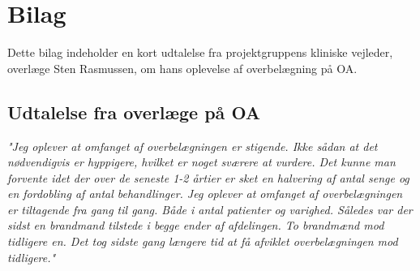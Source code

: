 \chapter{Bilag} \label{sten}
Dette bilag indeholder en kort udtalelse fra projektgruppens kliniske vejleder, overlæge Sten Rasmussen, om hans oplevelse af overbelægning på OA.
\section{Udtalelse fra overlæge på OA}
\textit{"Jeg oplever at omfanget af overbelægningen er stigende. Ikke sådan at det nødvendigvis er hyppigere, hvilket er noget sværere at vurdere. Det kunne man forvente idet der over de seneste 1-2 årtier er sket en halvering af antal senge og en fordobling af antal behandlinger.
Jeg oplever at omfanget af overbelægningen er tiltagende fra gang til gang. Både i antal patienter og varighed. Således var der sidst en brandmand tilstede i begge ender af afdelingen. To brandmænd mod tidligere en. Det tog sidste gang længere tid at få afviklet overbelægningen mod tidligere."}